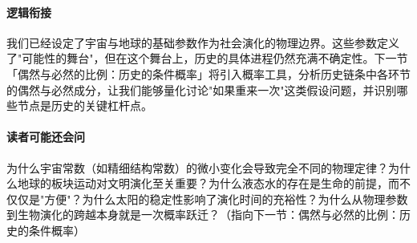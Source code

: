 \documentclass[openany]{book} %
\begin{document}
	\paragraph*{逻辑衔接}
	我们已经设定了宇宙与地球的基础参数作为社会演化的物理边界。这些参数定义了"可能性的舞台"，但在这个舞台上，历史的具体进程仍然充满不确定性。下一节「偶然与必然的比例：历史的条件概率」将引入概率工具，分析历史链条中各环节的偶然与必然成分，让我们能够量化讨论"如果重来一次"这类假设问题，并识别哪些节点是历史的关键杠杆点。
	
	\paragraph*{读者可能还会问}
	为什么宇宙常数（如精细结构常数）的微小变化会导致完全不同的物理定律？为什么地球的板块运动对文明演化至关重要？为什么液态水的存在是生命的前提，而不仅仅是"方便"？为什么太阳的稳定性影响了演化时间的充裕性？为什么从物理参数到生物演化的跨越本身就是一次概率跃迁？（指向下一节：偶然与必然的比例：历史的条件概率）
\end{document}
